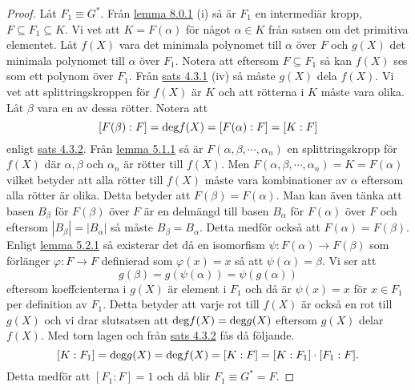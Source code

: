 \documentclass{article}
\newcommand{\grad}[0]{\textnormal{deg}}
\theoremstyle{definition}
\begin{document}
\begin{proof}
  Låt $F_1 \equiv G^*.$ Från \hyperlink{lemma9.0.1}{lemma 8.0.1} (i) så är $F_1$ en intermediär kropp, $F \subseteq F_1 \subseteq K$.
  Vi vet att $K = F(\alpha)$ för något $\alpha \in K$ från satsen om det primitiva elementet. Låt $f(X)$ vara det minimala polynomet till $\alpha$ över $F$
  och $g(X)$ det minimala polynomet till $\alpha$ över $F_1$. Notera att eftersom $F \subseteq F_1$ så kan $f(X)$ ses som ett polynom över $F_1$. 
  Från \hyperlink{minpol}{sats 4.3.1} (iv) så måste $g(X)$ dela $f(X)$. Vi vet att splittringskroppen för $f(X)$ är $K$ och att rötterna i $K$ måste vara olika. 
  Låt $\beta$ vara en av dessa rötter. Notera att 
  \[ [F(\beta): F] = \grad f(X) = [F(\alpha):F] = [K:F] \]
  enligt \hyperlink{5.3.2}{sats 4.3.2}. Från \hyperlink{lemma6.0.1}{lemma 5.1.1} så är $F(\alpha, \beta, \cdots, \alpha_n)$
  en splittringskropp för $f(X)$ där $\alpha, \beta$ och $\alpha_n$ är rötter till $f(X)$. Men $F(\alpha, \beta, \cdots, \alpha_n) = K = F(\alpha)$
  vilket betyder att alla rötter till $f(X)$ måste vara kombinationer av $\alpha$ eftersom alla rötter är olika. Detta betyder att $F(\beta) = F(\alpha)$.
  Man kan även tänka att basen $B_\beta$ för $F(\beta)$ över $F$ är en delmängd till basen $B_\alpha$ för $F(\alpha)$ över $F$ och eftersom 
  $|B_\beta| = |B_\alpha|$ så måste $B_\beta = B_\alpha$. Detta medför också att $F(\alpha) = F(\beta)$.
  Enligt \hyperlink{6.0.2}{lemma 5.2.1} så 
  existerar det då en isomorfism $\psi: F(\alpha) \rightarrow F(\beta)$
  som förlänger $\varphi: F \rightarrow F$ definierad som $\varphi(x) = x$ så att $\psi(\alpha) = \beta.$
  Vi ser att 
  \[g(\beta) = g(\psi(\alpha)) = \psi(g(\alpha))\]
  eftersom koeffcienterna i $g(X)$ är element i $F_1$ och då är $\psi(x) = x$ för $x \in F_1$ per definition av $F_1.$ Detta betyder 
  att varje rot till $f(X)$ är också en rot till $g(X)$ och vi drar slutsatsen att $\grad f(X) = \grad g(X)$ eftersom $g(X)$ delar $f(X)$. 
  Med torn lagen och från \hyperlink{5.3.2}{sats 4.3.2} fås då följande.
  \[ [K:F_1] = \grad g(X) = \grad f(X) = [K:F] = [K:F_1] \cdot [F_1: F]. \]
  Detta medför att $[F_1:F] = 1$ och då blir $F_1 \equiv G^* = F.$
\end{proof}
\end{document}
